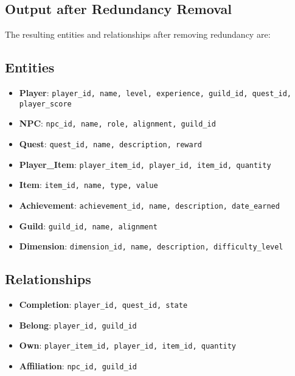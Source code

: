 \documentclass{article}%
\begin{document}
%
\subsection{Output after Redundancy Removal}%
\label{subsec:OutputafterRedundancyRemoval}%
The resulting entities and relationships after removing redundancy are:%
\subsection{Entities}%
\label{subsec:Entities}%
\begin{itemize}%
\item%
\textbf{Player}: \texttt{player\_id, name, level, experience, guild\_id, quest\_id, player\_score}%
\item%
\textbf{NPC}: \texttt{npc\_id, name, role, alignment, guild\_id}%
\item%
\textbf{Quest}: \texttt{quest\_id, name, description, reward}%
\item%
\textbf{Player\_Item}: \texttt{player\_item\_id, player\_id, item\_id, quantity}%
\item%
\textbf{Item}: \texttt{item\_id, name, type, value}%
\item%
\textbf{Achievement}: \texttt{achievement\_id, name, description, date\_earned}%
\item%
\textbf{Guild}: \texttt{guild\_id, name, alignment}%
\item%
\textbf{Dimension}: \texttt{dimension\_id, name, description, difficulty\_level}%
\end{itemize}

%
\subsection{Relationships}%
\label{subsec:Relationships}%
\begin{itemize}%
\item%
\textbf{Completion}: \texttt{player\_id, quest\_id, state}%
\item%
\textbf{Belong}: \texttt{player\_id, guild\_id}%
\item%
\textbf{Own}: \texttt{player\_item\_id, player\_id, item\_id, quantity}%
\item%
\textbf{Affiliation}: \texttt{npc\_id, guild\_id}%
\end{itemize}

%
\end{document}
